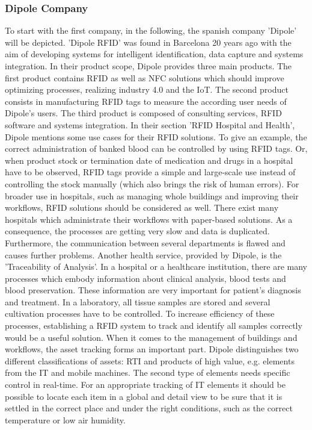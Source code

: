 \subsubsection{Dipole Company}

To start with the first company, in the following, the spanish company 'Dipole' \cite{dipole} will be depicted. 'Dipole RFID' was found in Barcelona 20 years ago with the aim of developing systems for intelligent identification, data capture and systems integration. In their product scope, Dipole provides three main products. The first product contains RFID as well as \ac{NFC} solutions which should improve optimizing processes, realizing industry 4.0 and the \ac{IoT}. The second product consists in manufacturing RFID tags to measure the according user needs of Dipole's users. The third product is composed of consulting services, RFID software and systems integration.
In their section 'RFID Hospital and Health', Dipole mentions some use cases for their RFID solutions. To give an example, the correct administration of banked blood can be controlled by using RFID tags. Or, when product stock or termination date of medication and drugs in a hospital have to be observed, RFID tags provide a simple and large-scale use instead of controlling the stock manually (which also brings the risk of human errors). For broader use in hospitals, such as managing whole buildings and improving their workflows, RFID solutions should be considered as well. There exist many hospitals which administrate their workflows with paper-based solutions. As a consequence, the processes are getting very slow and data is duplicated. Furthermore, the communication between several departments is flawed and causes further problems.
Another health service, provided by Dipole, is the 'Traceability of Analysis'. In a hospital or a healthcare institution, there are many processes which embody information about clinical analysis, blood tests and blood preservation. These information are very important for patient's diagnosis and treatment. In a laboratory, all tissue samples are stored and several cultivation processes have to be controlled. To increase efficiency of these processes, establishing a RFID system to track and identify all samples correctly would be a useful solution.
When it comes to the management of buildings and workflows, the asset tracking forms an important part. Dipole distinguishes two different classifications of assets: \ac{RTI} and products of high value, e.g. elements from the IT and mobile machines. The second type of elements needs specific control in real-time. For an appropriate tracking of IT elements it should be possible to locate each item in a global and detail view to be sure that it is settled in the correct place and under the right conditions, such as the correct temperature or low air humidity.
